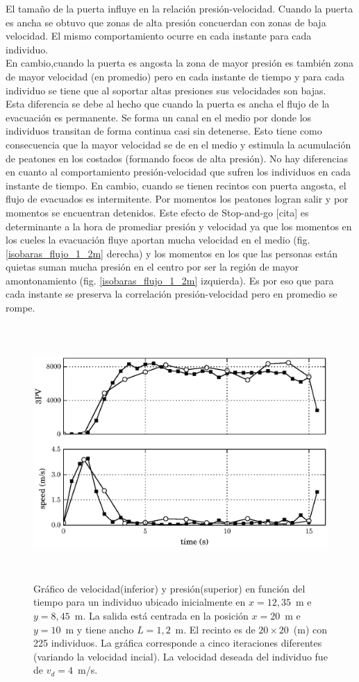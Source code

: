 El tamaño de la puerta influye en la relación presión-velocidad. Cuando la puerta es ancha se obtuvo que zonas de alta presión concuerdan con zonas de baja velocidad. El mismo comportamiento ocurre en cada instante para cada individuo. \\
En cambio,cuando la puerta es angosta la zona de mayor presión es también zona de mayor velocidad (en promedio) pero en cada instante de tiempo y para cada individuo se tiene que al soportar altas presiones sus velocidades son bajas. \\
Esta diferencia se debe al hecho que cuando la puerta es ancha el flujo de la evacuación es permanente. Se forma un canal en el medio por donde los individuos transitan de forma continua casi sin detenerse. Esto tiene como consecuencia que la mayor velocidad se de en el medio y estimula la acumulación de peatones en los costados (formando focos de alta presión). No hay diferencias en cuanto al comportamiento presión-velocidad que sufren los individuos en cada instante de tiempo.
En cambio, cuando se tienen recintos con puerta angosta, el flujo de evacuados es intermitente. Por momentos los peatones logran salir y por momentos se encuentran detenidos. Este efecto de Stop-and-go [cita] es determinante a la hora de promediar presión y velocidad ya que los momentos en los cueles la evacuación fluye aportan mucha velocidad en el medio (fig. \ref{isobaras_flujo_1_2m} derecha) y los momentos en los que las personas están quietas suman mucha presión en el centro por ser la región de mayor amontonamiento (fig. \ref{isobaras_flujo_1_2m} izquierda). Es por eso que para cada instante se preserva la correlación presión-velocidad pero en promedio se rompe.

\begin{figure}[H]
    \centering
    \includegraphics[height=9.7cm]{figuras/pv_vel_t_100_1_2.eps}
    \caption[width=5cm]{Gráfico de velocidad(inferior) y presión(superior) en función del tiempo para un individuo ubicado inicialmente en $x=12,35$~m e $y=8,45$~m.  La salida está centrada en la posición $x=20$~m e $y=10$~m y tiene ancho $L=1,2$~m. El recinto es de $20\times 20$~(m) con 225 individuos. La gráfica corresponde a cinco iteraciones diferentes (variando la velocidad incial). La velocidad deseada del individuo fue de $v_d=4$~m/s.}
    \label{pv_vel_t_100_1_2}
\end{figure}

